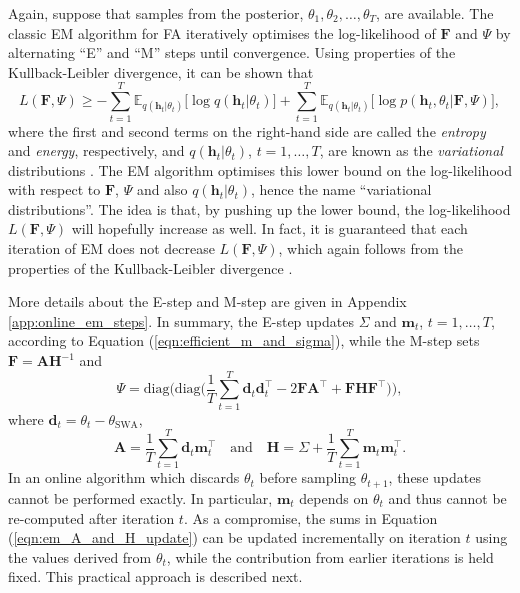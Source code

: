 \documentclass[msc,deptreport.inf]{infthesis} %
\newcommand{\matr}[1]{\mathbf{#1}}
\newcommand{\E}{\mathbb E}
\begin{document}
Again, suppose that samples from the posterior, $\theta_1, \theta_2, \dots,\theta_T$, are available. The classic EM algorithm for FA iteratively optimises the log-likelihood of $\matr{F}$ and $\Psi$ by alternating ``E'' and ``M'' steps until convergence. Using properties of the Kullback-Leibler divergence, it can be shown that 
\begin{equation}\label{eqn:EM_bound}
	L(\matr{F}, \Psi) \geq 
	- \sum_{t=1}^T \E_{q(\matr{h}_t | \theta_t)} \big[\log q(\matr{h}_t | \theta_t)\big]
	+ \sum_{t=1}^T \E_{q(\matr{h}_t | \theta_t)} \big[\log p(\matr{h}_t, \theta_t | \matr{F}, \Psi)\big],
\end{equation}
where the first and second terms on the right-hand side are called the \emph{entropy} and \emph{energy}, respectively, and $q(\matr{h}_t | \theta_t)$, $t=1,\dots,T$, are known as the \emph{variational} distributions \cite{barber2007}. The EM algorithm optimises this lower bound on the log-likelihood with respect to $\matr{F}$, $\Psi$ and also $q(\matr{h}_t | \theta_t)$, hence the name ``variational distributions''. The idea is that, by pushing up the lower bound, the log-likelihood $L(\matr{F}, \Psi)$ will hopefully increase as well. In fact, it is guaranteed that each iteration of EM does not decrease $L(\matr{F}, \Psi)$, which again follows from the properties of the Kullback-Leibler divergence \cite{barber2007}.

More details about the E-step and M-step are given in Appendix \ref{app:online_em_steps}. In summary, the E-step updates $\Sigma$ and $\matr{m}_t$, $t=1,\dots,T$, according to Equation (\ref{eqn:efficient_m_and_sigma}), while the M-step sets $\matr{F} = \matr{A}\matr{H}^{-1}$ and
\begin{equation}\label{eqn:em_Psi_update}
	\Psi = \text{diag}\Bigg(\text{diag}\Bigg( \frac{1}{T} \sum_{t=1}^T \matr{d}_t \matr{d}_t^\intercal - 2\matr{FA}^\intercal + \matr{FHF}^\intercal \Bigg)\Bigg),
\end{equation}
where $\matr{d}_t = \theta_t - \theta_{\text{SWA}}$,
\begin{equation}\label{eqn:em_A_and_H_update}
	\matr{A} = \frac{1}{T} \sum_{t=1}^T \matr{d}_t \matr{m}_t^\intercal \quad \text{and} \quad 
	\matr{H} = \Sigma + \frac{1}{T} \sum_{t=1}^T \matr{m}_t \matr{m}_t^\intercal.
\end{equation}
In an online algorithm which discards $\theta_t$ before sampling $\theta_{t + 1}$, these updates cannot be performed exactly. In particular, $\matr{m}_t$ depends on $\theta_t$ and thus cannot be re-computed after iteration $t$. As a compromise, the sums in Equation (\ref{eqn:em_A_and_H_update}) can be updated incrementally on iteration $t$ using the values derived from $\theta_t$, while the contribution from earlier iterations is held fixed. This practical approach is described next. 
\end{document}

